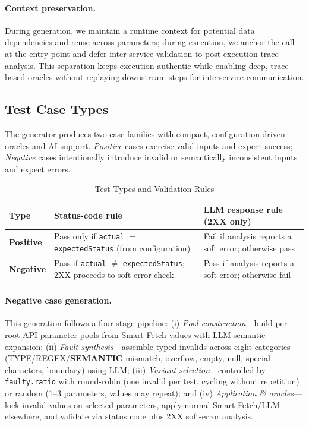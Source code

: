 \documentclass[conference]{IEEEtran}
\begin{document}
\paragraph{Context preservation.}
During generation, we maintain a runtime context for potential data dependencies and reuse across parameters; during execution, we anchor the call at the entry point and defer inter-service validation to post-execution trace analysis. This separation keeps execution authentic while enabling deep, trace-based oracles without replaying downstream steps for interservice communication.



\subsection{Test Case Types}\label{ssec:test-types}
The generator produces two case families with compact, configuration-driven oracles and AI support. \emph{Positive} cases exercise valid inputs and expect success; \emph{Negative} cases intentionally introduce invalid or semantically inconsistent inputs and expect errors.

\begin{table}[t]
\centering
\caption{Test Types and Validation Rules}
\label{tab:test-types}
\renewcommand{\arraystretch}{1.15}\setlength{\tabcolsep}{4pt}
\begin{tabularx}{\columnwidth}{>{\bfseries}p{} X X}
\toprule
Type & Status-code rule & LLM response rule (2XX only) \\
\midrule
Positive & Pass only if \texttt{actual} $=$ \texttt{expectedStatus} (from configuration) & Fail if analysis reports a soft error; otherwise pass \\
Negative & Pass if \texttt{actual} $\neq$ \texttt{expectedStatus}; 2XX proceeds to soft-error check & Pass if analysis reports a soft error; otherwise fail \\
\bottomrule
\end{tabularx}
\end{table}
\paragraph{Negative case generation.}
\noindent This generation follows a four-stage pipeline: (i) \emph{Pool construction}—build per–root-API parameter pools from Smart Fetch values with LLM semantic expansion; (ii) \emph{Fault synthesis}—assemble typed invalids across eight categories (TYPE/REGEX/\textbf{SEMANTIC} mismatch, overflow, empty, null, special characters, boundary) using LLM; (iii) \emph{Variant selection}—controlled by \texttt{faulty.ratio} with round-robin (one invalid per test, cycling without repetition) or random (1--3 parameters, values may repeat); and (iv) \emph{Application \& oracles}—lock invalid values on selected parameters, apply normal Smart Fetch/LLM elsewhere, and validate via status code plus 2XX soft-error analysis.
\end{document}
